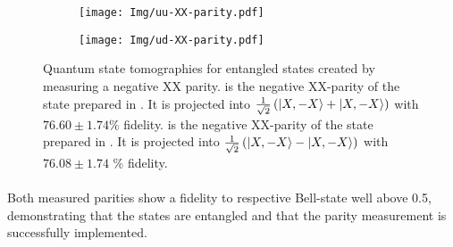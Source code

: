 \begin{figure}[htbp]
    \begin{subfigure}[t]{0.49\textwidth}\centering
        \caption{}
        \texttt{[image: Img/uu-XX-parity.pdf]}
        \label{fig:uu-XX}
    \end{subfigure}
    \begin{subfigure}[t]{0.49\textwidth}\centering
        \caption{}
        \texttt{[image: Img/ud-XX-parity.pdf]}
        \label{fig:ud-XX}
    \end{subfigure}
    \caption{ Quantum state tomographies for entangled states created by measuring a negative XX parity.
     is the negative XX-parity of the state prepared in . It is projected into $    \tfrac{1}{\sqrt{2}} \left( {\left\vert{X,-X}\right\rangle} +{\left\vert{X,-X}\right\rangle} \right)
$ with  $76.60 \pm 1.74\%$ fidelity.
     is the negative XX-parity of the state prepared in . It is projected into $\tfrac{1}{\sqrt{2}} \left( {\left\vert{X,-X}\right\rangle} -{\left\vert{X,-X}\right\rangle} \right)$  with  $76.08 \pm 1.74$ \% fidelity.
    }
    \label{fig:2qubit_parity_Tomos}
\end{figure}

\paragraph{ }
Both measured parities show a fidelity to respective Bell-state well above 0.5, demonstrating that the states are entangled and that the parity measurement is successfully implemented.


